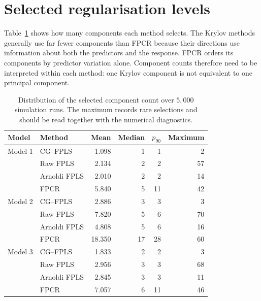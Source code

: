 \section{Selected regularisation levels}
\label{sec:results-components}

Table~\ref{tab:results-components} shows how many components each method
selects. The Krylov methods generally use far fewer components than FPCR
because their directions use information about both the predictors and the
response. FPCR orders its components by predictor variation alone. Component
counts therefore need to be interpreted within each method: one Krylov
component is not equivalent to one principal component.

\begin{table}[htbp]
    \centering
    \small
    \caption[Distributions of selected component counts]{Distribution of the selected component count over $5{,}000$
    simulation runs. The maximum records rare selections and should be read
    together with the numerical diagnostics.}
    \label{tab:results-components}
    \begin{tabular}{@{}llrrrr@{}}
        \toprule
        Model & Method & Mean & Median & $p_{90}$ & Maximum \\
        \midrule
        Model 1 & CG--FPLS       & 1.098 & 1 & 1 & 2 \\
                & Raw FPLS       & 2.134 & 2 & 2 & 57 \\
                & Arnoldi FPLS   & 2.010 & 2 & 2 & 14 \\
                & FPCR           & 5.840 & 5 & 11 & 42 \\
        \addlinespace
        Model 2 & CG--FPLS       & 2.886 & 3 & 3 & 3 \\
                & Raw FPLS       & 7.820 & 5 & 6 & 70 \\
                & Arnoldi FPLS   & 4.808 & 5 & 6 & 16 \\
                & FPCR           & 18.350 & 17 & 28 & 60 \\
        \addlinespace
        Model 3 & CG--FPLS       & 1.833 & 2 & 2 & 3 \\
                & Raw FPLS       & 2.956 & 3 & 3 & 68 \\
                & Arnoldi FPLS   & 2.845 & 3 & 3 & 11 \\
                & FPCR           & 7.057 & 6 & 11 & 46 \\
        \bottomrule
    \end{tabular}
\end{table}

